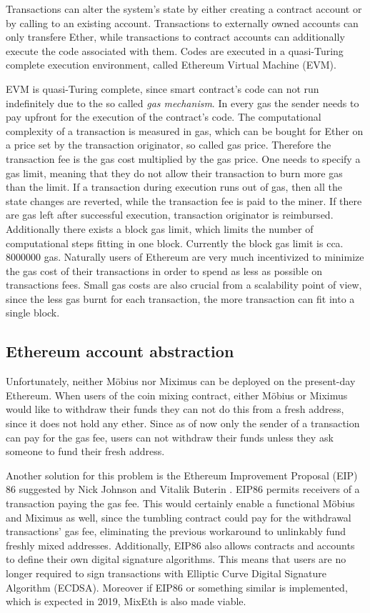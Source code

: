 \documentclass[a4paper]{article}
\theoremstyle{definition}
\begin{document}
Transactions can alter the system's state by either creating a contract account or by calling to an existing account. Transactions to externally owned accounts can only transfere Ether, while transactions to contract accounts can additionally execute the code associated with them. Codes are executed in a quasi-Turing complete execution environment, called Ethereum Virtual Machine (EVM).

EVM is quasi-Turing complete, since smart contract's code can not run indefinitely due to the so called \textit{gas mechanism}. In every gas the sender needs to pay upfront for the execution of the contract's code. The computational complexity of a transaction is measured in gas, which can be bought for Ether on a price set by the transaction originator, so called gas price. Therefore the transaction fee is the gas cost multiplied by the gas price. One needs to specify a gas limit, meaning that they do not allow their transaction to burn more gas than the limit. If a transaction during execution runs out of gas, then all the state changes are reverted, while the transaction fee is paid to the miner. If there are gas left after successful execution, transaction originator is reimbursed. Additionally there exists a block gas limit, which limits the number of computational steps fitting in one block. Currently the block gas limit is cca. $\num[group-separator={,}]{8000000}$ gas. Naturally users of Ethereum are very much incentivized to minimize the gas cost of their transactions in order to spend as less as possible on transactions fees. Small gas costs are also crucial from a scalability point of view, since the less gas burnt for each transaction, the more transaction can fit into a single block.    

\subsection{Ethereum account abstraction}
Unfortunately, neither Möbius nor Miximus can be deployed on the present-day Ethereum. When users of the coin mixing contract, either Möbius or Miximus would like to withdraw their funds they can not do this from a fresh address, since it does not hold any ether. Since as of now only the sender of a transaction can pay for the gas fee, users can not withdraw their funds unless they ask someone to fund their fresh address.     

Another solution for this problem is the Ethereum Improvement Proposal (EIP) 86 suggested by Nick Johnson and Vitalik Buterin \cite{buterin2017accounteip}. EIP86 permits receivers of a transaction paying the gas fee. This would certainly enable a functional Möbius and Miximus as well, since the tumbling contract could pay for the withdrawal transactions' gas fee, eliminating the previous workaround to unlinkably fund freshly mixed addresses. Additionally, EIP86 also allows contracts and accounts to define their own digital signature algorithms. This means that users are no longer required to sign transactions with Elliptic Curve Digital Signature Algorithm (ECDSA). Moreover if EIP86 or something similar is implemented, which is expected in 2019, MixEth is also made viable.  
\end{document}
